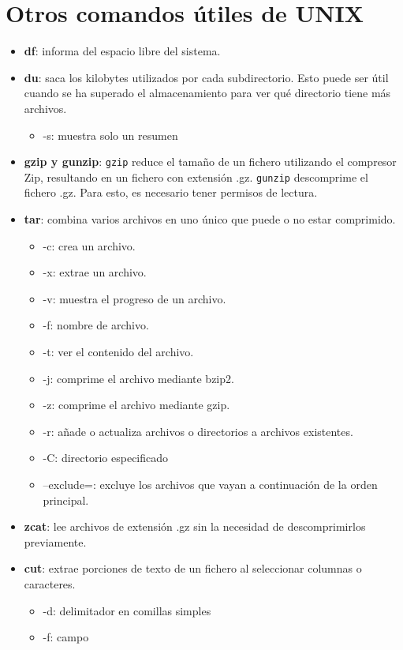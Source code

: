 \documentclass{config/apuntes}
\begin{document}
\section{Otros comandos útiles de UNIX}
\begin{itemize}
\item \textbf{df}: informa del espacio libre del sistema.

\item \textbf{du}: saca los kilobytes utilizados por cada subdirectorio. Esto puede ser útil cuando se ha superado el almacenamiento para ver qué directorio tiene más archivos. \begin{itemize}
\item -s: muestra solo un resumen
\end{itemize}

\item \textbf{gzip y gunzip}: \texttt{gzip} reduce el tamaño de un fichero utilizando el compresor Zip, resultando en un fichero con extensión .gz. \texttt{gunzip} descomprime el fichero .gz. Para esto, es necesario tener permisos de lectura.

\item \textbf{tar}: combina varios archivos en uno único que puede o no estar comprimido. \begin{itemize}
\item -c: crea un archivo.
\item -x: extrae un archivo.
\item -v: muestra el progreso de un archivo.
\item -f: nombre de archivo.
\item -t: ver el contenido del archivo.
\item -j: comprime el archivo mediante bzip2.
\item -z: comprime el archivo mediante gzip.
\item -r: añade o actualiza archivos o directorios a archivos existentes.
\item -C: directorio especificado
\item --exclude=: excluye los archivos que vayan a continuación de la orden principal. 
\end{itemize}

\item \textbf{zcat}: lee archivos de extensión .gz sin la necesidad de descomprimirlos previamente. 

\item \textbf{cut}: extrae porciones de texto de un fichero al seleccionar columnas o caracteres. \begin{itemize}
\item -d: delimitador en comillas simples
\item -f: campo
\end{itemize}
 

\end{itemize}
\end{document}
